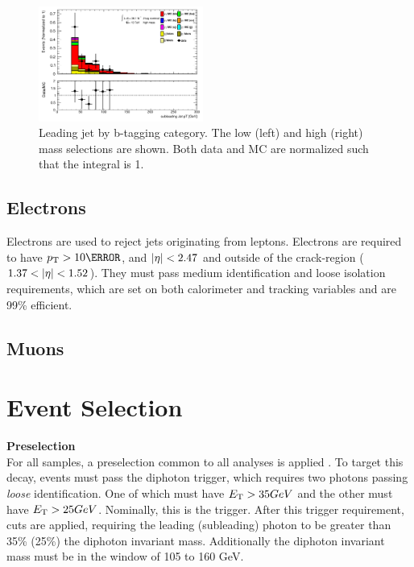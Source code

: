 \begin{figure}[htbp]
  \includegraphics[width=0.48\textwidth]{chapters/chapter5_yybb/images/data_MC_comparison/h_SR_h_2t_nominal_subleadingJet_pt.pdf}
  \caption[Subleading jet \pt.]{Leading jet \pt by b-tagging category. The low (left) and high (right) mass selections are shown. Both data and MC are normalized such that the integral is 1.
  \label{fig:jet_s_pt}}
\end{figure}


\subsection{Electrons}

Electrons are used to reject jets originating from leptons. Electrons are required to have $\pt > \unit{10}{\GeV}$, and $|\eta| < 2.47$ and outside of the crack-region ($1.37 < |\eta| < 1.52$). They must pass medium identification and loose isolation requirements, which are set on both calorimeter and tracking variables and are 99\% efficient.

\subsection{Muons}



\section{Event Selection}
\noindent\textbf{Preselection}\\
\indent For all samples, a preselection common to all \Hgg analyses is applied \cite{hgam-preselection}. To target this decay, events must pass the diphoton trigger, which requires two photons passing \textit{loose} identification. One of which must have $\et > \unit{35}{GeV}$ and the other must have $\et > \unit{25}{GeV}$. Nominally, this is the  trigger. After this trigger requirement, \pt cuts are applied, requiring the leading (subleading) photon \pt to be greater than 35\% (25\%) the diphoton invariant mass. Additionally the diphoton invariant mass must be in the window of 105 to 160 GeV.

